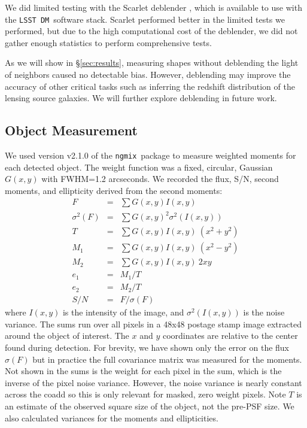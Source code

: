 \documentclass[twocolumn,twocolappendix,astrosym]{openjournal}
\newcommand{\ngmix}{\texttt{ngmix}}
\newcommand{\dm}{\texttt{LSST DM}}
\begin{document}
We did limited testing with the Scarlet deblender \citep{MelchiorScarlet2018},
which is available to use with the \dm\ software stack. Scarlet performed
better in the limited tests we performed, but due to the high computational
cost of the deblender, we did not gather enough statistics to perform
comprehensive tests.

As we will show in \S \ref{sec:results}, measuring shapes without deblending
the light of neighbors caused no detectable bias.  However, deblending may
improve the accuracy of other critical tasks such as inferring the redshift
distribution of the lensing source galaxies.  We will further explore
deblending in future work.

\subsection{Object Measurement} \label{sec:mdet:meas}

We used version v2.1.0 of the \ngmix\ package to measure weighted moments for
each detected object. The weight function was a fixed, circular, Gaussian $G(x,
y)$ with FWHM=1.2 arcseconds.  We recorded the flux,
S/N, second moments, and ellipticity derived from the second moments:
\begin{eqnarray} \label{eq:moments}
    F &=& \sum G(x, y) I(x, y) \nonumber \\
    \sigma^2(F) &=& \sum G(x, y)^2 \sigma^2(I(x, y)) \nonumber \\
    T &=& \sum G(x, y) I(x, y) ~ (x^2 + y^2) \nonumber \\
    M_1 &=& \sum G(x, y) I(x, y) ~ (x^2 - y^2) \\
    M_2 &=& \sum G(x, y) I(x, y) ~ 2 x y \nonumber \\
    e_1 &=& M_1 / T \nonumber \\
    e_2 &=& M_2 / T \nonumber \\
    S/N &=& F / \sigma(F) \nonumber
\end{eqnarray}
where $I(x, y)$ is the intensity of the image, and $\sigma^2(I(x, y))$ is the
noise variance. The sums run over all pixels in a 48x48 postage stamp image
extracted around the object of interest.  The $x$ and $y$ coordinates are
relative to the center found during detection.  For brevity, we have shown only
the error on the flux $\sigma(F)$ but in practice the full covariance matrix
was measured for the moments.  Not shown in the sums is the weight for each
pixel in the sum, which is the inverse of the pixel noise variance. However,
the noise variance is nearly constant across the coadd so this is only relevant
for masked, zero weight pixels.  Note $T$ is an estimate of the observed square
size of the object, not the pre-PSF size.  We also calculated variances for the
moments and ellipticities.
\end{document}

